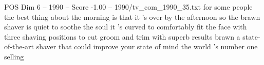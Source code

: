 \begin{textsample}{POS Dim 6 – 1990 – Score -1.00 – 1990/tv\_com\_1990\_35.txt}  \label{ex:f6_pos_079}
for some people the best thing about the morning is that it 's over by the afternoon so the brawn shaver is quiet to soothe the soul it 's curved to comfortably fit the face with three shaving positions to cut groom and trim with superb results brawn a state-of-the-art shaver that could improve your state of mind the world 's number one selling

\end{textsample}

